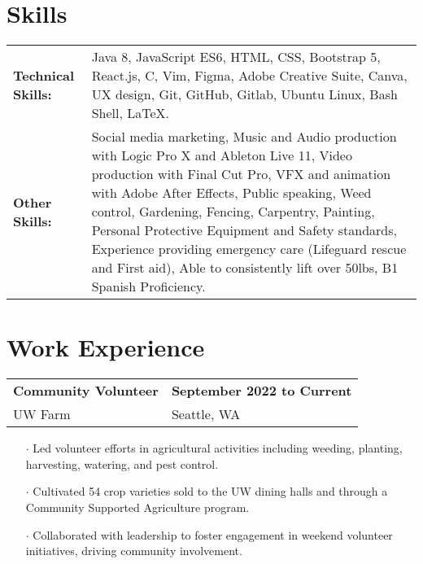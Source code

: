 \documentclass[11pt,letterpaper]{article}
\begin{document}
\section{Skills}
\begin{tabularx}{\textwidth}{lX}
\normalsize \textbf{Technical Skills:} & \small Java 8, JavaScript ES6, HTML, CSS, Bootstrap 5, React.js, C, Vim, Figma, Adobe Creative Suite, Canva, UX design, Git, GitHub, Gitlab, Ubuntu Linux, Bash Shell, LaTeX.\\
\normalsize \textbf{Other Skills:} & \small Social media marketing, Music and Audio production with Logic Pro X and Ableton Live 11, Video production with Final Cut Pro, VFX and animation with Adobe After Effects, Public speaking, Weed control, Gardening, Fencing, Carpentry, Painting, Personal Protective Equipment and Safety standards, Experience providing emergency care (Lifeguard rescue and First aid), Able to consistently lift over 50lbs, B1 Spanish Proficiency. \\ 
\end{tabularx}


\section{Work Experience}

\begin{tabularx}{\textwidth}{lX}
    \textbf{Community Volunteer} & \hfill \textbf{September 2022 to Current} \\[0pt]
    \small
    UW Farm & \hfill Seattle, WA \\[0pt]
\end{tabularx}

\begin{itemize}
    \small
    \item[$\cdot$] Led volunteer efforts in agricultural activities including weeding, planting, harvesting, watering, and pest control.
    \item[$\cdot$] Cultivated 54 crop varieties sold to the UW dining halls and through a Community Supported Agriculture program.
    \item[$\cdot$] Collaborated with leadership to foster engagement in weekend volunteer initiatives, driving community involvement.
\end{itemize}
\end{document}
